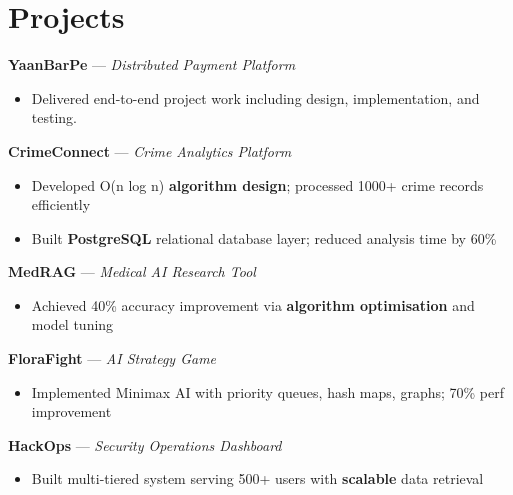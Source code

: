\documentclass[letterpaper,10pt]{article}
\begin{document}
\section{Projects}

\textbf{YaanBarPe} — \textit{Distributed Payment Platform}
\begin{itemize}
\item Delivered end-to-end project work including design, implementation, and testing.
\end{itemize}

\textbf{CrimeConnect} — \textit{Crime Analytics Platform}
\begin{itemize}
\item Developed O(n log n) \textbf{algorithm design}; processed 1000+ crime records efficiently
\item Built \textbf{PostgreSQL} relational database layer; reduced analysis time by 60\%
\end{itemize}

\textbf{MedRAG} — \textit{Medical AI Research Tool}
\begin{itemize}
\item Achieved 40\% accuracy improvement via \textbf{algorithm optimisation} and model tuning
\end{itemize}

\textbf{FloraFight} — \textit{AI Strategy Game}
\begin{itemize}
\item Implemented Minimax AI with priority queues, hash maps, graphs; 70\% perf improvement
\end{itemize}

\textbf{HackOps} — \textit{Security Operations Dashboard}
\begin{itemize}
\item Built multi-tiered system serving 500+ users with \textbf{scalable} data retrieval
\end{itemize}

\end{document}
